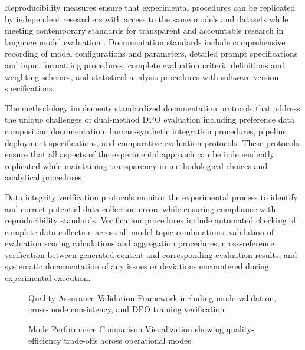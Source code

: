 Reproducibility measures ensure that experimental procedures can be replicated by independent researchers with access to the same models and datasets while meeting contemporary standards for transparent and accountable research in language model evaluation \cite{ma2024reproducibility_query}. Documentation standards include comprehensive recording of model configurations and parameters, detailed prompt specifications and input formatting procedures, complete evaluation criteria definitions and weighting schemes, and statistical analysis procedures with software version specifications.

The methodology implements standardized documentation protocols that address the unique challenges of dual-method DPO evaluation including preference data composition documentation, human-synthetic integration procedures, pipeline deployment specifications, and comparative evaluation protocols. These protocols ensure that all aspects of the experimental approach can be independently replicated while maintaining transparency in methodological choices and analytical procedures.

Data integrity verification protocols monitor the experimental process to identify and correct potential data collection errors while ensuring compliance with reproducibility standards. Verification procedures include automated checking of complete data collection across all model-topic combinations, validation of evaluation scoring calculations and aggregation procedures, cross-reference verification between generated content and corresponding evaluation results, and systematic documentation of any issues or deviations encountered during experimental execution.

\begin{figure}[htbp]
    \centering
    \caption{Quality Assurance Validation Framework including mode validation, cross-mode consistency, and DPO training verification}
    \label{fig:quality-assurance-framework}
\end{figure}

\begin{figure}[htbp]
    \centering
    \caption{Mode Performance Comparison Visualization showing quality-efficiency trade-offs across operational modes}
    \label{fig:mode-performance-comparison}
\end{figure}


